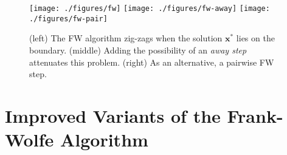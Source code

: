 \documentclass{article} %
\newcommand{\x}{\bm{x}}
\newcommand{\0}{\mathbf{0}} %
\begin{document}
\begin{figure}[t]
  \vspace{-2.5mm}
  \centering
  \texttt{[image: ./figures/fw]} 
  \texttt{[image: ./figures/fw-away]} 
  \texttt{[image: ./figures/fw-pair]} 
  \vspace{-2mm}
  \caption{\small (left) The FW algorithm zig-zags when the solution $\x^*$ lies on the boundary. (middle) Adding the possibility of an \emph{away step} attenuates this problem. (right) As an alternative, a pairwise FW step. 
  }
  \label{fig:FWzigzag} \vspace{1mm}
\end{figure}


\vspace{-2mm}
%
\section{Improved Variants of the Frank-Wolfe Algorithm}%
\label{sec:variants}\vspace{-2mm}

%
\setlength{\intextsep}{2mm}
\end{document}
